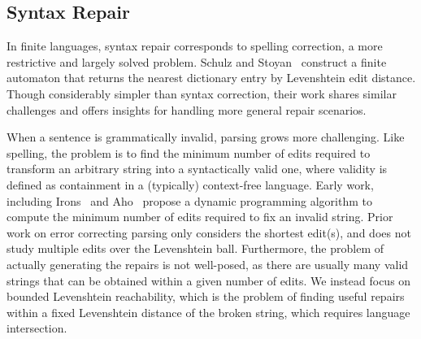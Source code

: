 \documentclass[sigplan,review,anonymous,acmsmall]{acmart}\settopmatter{printfolios=false,printccs=false,printacmref=false}
\begin{document}
\subsection{Syntax Repair}

In finite languages, syntax repair corresponds to spelling correction, a more restrictive and largely solved problem. Schulz and Stoyan~\cite{schulz2002fast} construct a finite automaton that returns the nearest dictionary entry by Levenshtein edit distance. Though considerably simpler than syntax correction, their work shares similar challenges and offers insights for handling more general repair scenarios.

When a sentence is grammatically invalid, parsing grows more challenging. Like spelling, the problem is to find the minimum number of edits required to transform an arbitrary string into a syntactically valid one, where validity is defined as containment in a (typically) context-free language. Early work, including Irons~\cite{irons1963error} and Aho~\cite{aho1972minimum} propose a dynamic programming algorithm to compute the minimum number of edits required to fix an invalid string. Prior work on error correcting parsing only considers the shortest edit(s), and does not study multiple edits over the Levenshtein ball. Furthermore, the problem of actually generating the repairs is not well-posed, as there are usually many valid strings that can be obtained within a given number of edits. We instead focus on bounded Levenshtein reachability, which is the problem of finding useful repairs within a fixed Levenshtein distance of the broken string, which requires language intersection.


\end{document}
